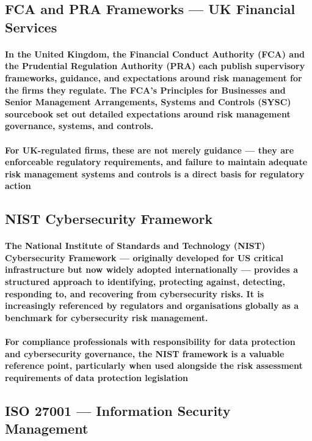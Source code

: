 \subsection{FCA and PRA Frameworks — UK Financial Services}
\paragraph{In the United Kingdom, the \textbf{Financial Conduct Authority (FCA)} and the \textbf{Prudential Regulation Authority (PRA)} each publish supervisory frameworks, guidance, and expectations around risk management for the firms they regulate. The FCA's \textbf{Principles for Businesses} and \textbf{Senior Management Arrangements, Systems and Controls (SYSC)} sourcebook set out detailed expectations around risk management governance, systems, and controls.}
\paragraph{For UK-regulated firms, these are not merely guidance — they are enforceable regulatory requirements, and failure to maintain adequate risk management systems and controls is a direct basis for regulatory action}
\subsection{NIST Cybersecurity Framework}
\paragraph{The \textbf{National Institute of Standards and Technology (NIST) Cybersecurity Framework} — originally developed for US critical infrastructure but now widely adopted internationally — provides a structured approach to identifying, protecting against, detecting, responding to, and recovering from cybersecurity risks. It is increasingly referenced by regulators and organisations globally as a benchmark for cybersecurity risk management.}
\paragraph{For compliance professionals with responsibility for data protection and cybersecurity governance, the NIST framework is a valuable reference point, particularly when used alongside the risk assessment requirements of data protection legislation}
\subsection{ISO 27001 — Information Security Management}
